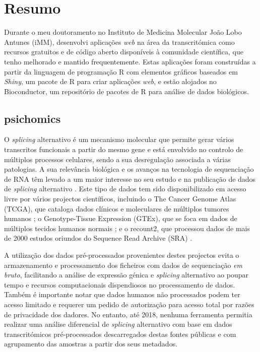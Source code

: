 \chapter*{Resumo}

Durante o meu doutoramento no Instituto de Medicina Molecular João Lobo Antunes (iMM), desenvolvi aplicações \emph{web} na área da transcritómica como recursos gratuitos e de código aberto disponíveis à comunidade científica, que tenho melhorado e mantido frequentemente. Estas aplicações foram construídas a partir da linguagem de programação R com elementos gráficos baseados em \emph{Shiny}, um pacote de R para criar aplicações \emph{web}, e estão alojados no Bioconductor, um repositório de pacotes de R para análise de dados biológicos.

\section*{psichomics}

O \emph{splicing} alternativo é um mecanismo molecular que permite gerar vários transcritos funcionais a partir do mesmo gene e está envolvido no controlo de múltiplos processos celulares, sendo a sua desregulação associada a várias patologias. A sua relevância biológica e os avanços na tecnologia de sequenciação de RNA têm levado a um maior interesse no seu estudo e na publicação de dados de \emph{splicing} alternativo \cite{wang:2008wa,tsai:2015ve,danan-gotthold:2015ut,chhibber:2017wm,climente-gonzalez:2017uj}. Este tipo de dados tem sido disponibilizado em acesso livre por vários projectos científicos, incluindo o The Cancer Genome Atlas (TCGA), que cataloga dados clínicos e moleculares de múltiplos tumores humanos \cite{chang:2013ww}; o Genotype-Tissue Expression (GTEx), que se foca em dados de múltiplos tecidos humanos normais \cite{lonsdale:2013uo}; e o recount2, que processou dados de mais de 2000 estudos oriundos do Sequence Read Archive (SRA) \cite{collado-torres:2017uw}.

A utilização dos dados pré-processados provenientes destes projectos evita o armazenamento e processamento dos ficheiros com dados de sequenciação \emph{em bruto}, facilitando a análise de expressão génica e \emph{splicing} alternativo ao poupar tempo e recursos computacionais dispendiosos no processamento de dados. Também é importante notar que dados humanos não processados podem ter acesso limitado e requerer um pedido de autorização para acesso total por razões de privacidade dos dadores. No entanto, até 2018, nenhuma ferramenta permitia realizar uma análise diferencial de \emph{splicing} alternativo com base em dados transcritómicos pré-processados descarregados destas fontes públicas e com agrupamento das amostras a partir dos seus metadados.

